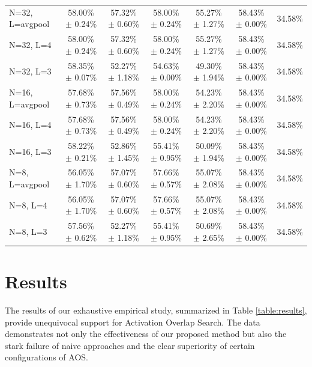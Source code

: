 \documentclass{article}
\theoremstyle{plain}
\theoremstyle{definition}
\theoremstyle{remark}
\begin{document}
\begin{table}[t]
\begin{center}
\begin{small}
\begin{sc}
\begin{tabular}{lcccccc}
\midrule
        N=32, L=avgpool & 58.00\% $\pm$ 0.24\% & 57.32\% $\pm$ 0.60\% & 58.00\% $\pm$ 0.24\% & 55.27\% $\pm$ 1.27\% & 58.43\% $\pm$ 0.00\% & 34.58\% \\
        N=32, L=4 & 58.00\% $\pm$ 0.24\% & 57.32\% $\pm$ 0.60\% & 58.00\% $\pm$ 0.24\% & 55.27\% $\pm$ 1.27\% & 58.43\% $\pm$ 0.00\% & 34.58\% \\
        N=32, L=3 & 58.35\% $\pm$ 0.07\% & 52.27\% $\pm$ 1.18\% & 54.63\% $\pm$ 0.00\% & 49.30\% $\pm$ 1.94\% & 58.43\% $\pm$ 0.00\% & 34.58\% \\
\midrule
        N=16, L=avgpool & 57.68\% $\pm$ 0.73\% & 57.56\% $\pm$ 0.49\% & 58.00\% $\pm$ 0.24\% & 54.23\% $\pm$ 2.20\% & 58.43\% $\pm$ 0.00\% & 34.58\% \\
        N=16, L=4 & 57.68\% $\pm$ 0.73\% & 57.56\% $\pm$ 0.49\% & 58.00\% $\pm$ 0.24\% & 54.23\% $\pm$ 2.20\% & 58.43\% $\pm$ 0.00\% & 34.58\% \\
        N=16, L=3 & 58.22\% $\pm$ 0.21\% & 52.86\% $\pm$ 1.45\% & 55.41\% $\pm$ 0.95\% & 50.09\% $\pm$ 1.94\% & 58.43\% $\pm$ 0.00\% & 34.58\% \\
\midrule
        N=8, L=avgpool & 56.05\% $\pm$ 1.70\% & 57.07\% $\pm$ 0.60\% & 57.66\% $\pm$ 0.57\% & 55.07\% $\pm$ 2.08\% & 58.43\% $\pm$ 0.00\% & 34.58\% \\
        N=8, L=4 & 56.05\% $\pm$ 1.70\% & 57.07\% $\pm$ 0.60\% & 57.66\% $\pm$ 0.57\% & 55.07\% $\pm$ 2.08\% & 58.43\% $\pm$ 0.00\% & 34.58\% \\
        N=8, L=3 & 57.56\% $\pm$ 0.62\% & 52.27\% $\pm$ 1.18\% & 55.41\% $\pm$ 0.95\% & 50.69\% $\pm$ 2.65\% & 58.43\% $\pm$ 0.00\% & 34.58\% \\
\bottomrule
\end{tabular}
\end{sc}
\end{small}
\end{center}
\vskip -0.1in
\end{table}

\section{Results}

The results of our exhaustive empirical study, summarized in Table \ref{table:results}, provide unequivocal support for Activation Overlap Search. The data demonstrates not only the effectiveness of our proposed method but also the stark failure of naive approaches and the clear superiority of certain configurations of AOS.
\end{document}
